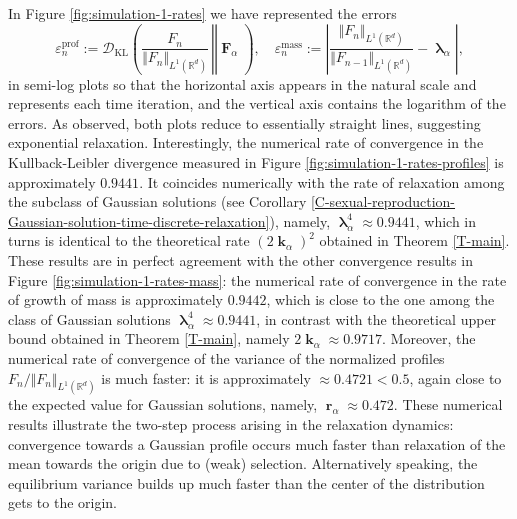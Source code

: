 \documentclass[reqno]{amsart}
\DeclareMathOperator{\blambda}{\boldsymbol{\lambda}}
\DeclareMathOperator{\bF}{\boldsymbol{F}}
\DeclareMathOperator{\bk}{\boldsymbol{k}}
\DeclareMathOperator{\br}{\boldsymbol{r}}
\numberwithin{equation}{section}
\begin{document}
{In Figure \ref{fig:simulation-1-rates} we have represented the errors
$$\varepsilon_n^{\text{prof}}:=\mathcal{D}_{\text{KL}}\left(\left.\frac{F_n}{\Vert F_n\Vert_{L^1(\mathbb{R}^d)}}\,\right\Vert \bF_\alpha\right),\quad \varepsilon_n^{\text{mass}}:=\left\vert\frac{\Vert F_n\Vert_{L^1(\mathbb{R}^d)}}{\Vert F_{n-1}\Vert_{L^1(\mathbb{R}^d)}}-\blambda_\alpha\right\vert,$$
in semi-log plots so that the horizontal axis appears in the natural scale and represents each time iteration, and the vertical axis contains the logarithm of the errors. As observed, both plots reduce to essentially straight lines, suggesting exponential relaxation. Interestingly, the numerical rate of convergence in the Kullback-Leibler divergence measured in Figure \ref{fig:simulation-1-rates-profiles} is approximately $0.9441$. It coincides numerically with the rate of relaxation among the subclass of Gaussian solutions (see Corollary \ref{C-sexual-reproduction-Gaussian-solution-time-discrete-relaxation}), namely, $\blambda_\alpha^4\approx 0.9441$, which in turns is identical to the theoretical rate $(2\bk_\alpha)^2$ obtained in Theorem \ref{T-main}.
These results are in perfect agreement with the other convergence results in Figure \ref{fig:simulation-1-rates-mass}: the numerical rate of convergence in the rate of growth of mass is approximately $0.9442$, which is close to the one among the class of Gaussian solutions $\blambda_\alpha^4\approx 0.9441$, in contrast with the theoretical upper bound obtained in Theorem \ref{T-main}, namely $2\bk_\alpha\approx 0.9717$. Moreover, the numerical rate of convergence of the variance of the normalized profiles $F_n/\Vert F_n\Vert_{L^1(\mathbb{R}^d)}$ is much faster: it is approximately $\approx 0.4721<0.5$, again close to the expected value for Gaussian solutions, namely,
$\br_\alpha\approx 0.472$. These numerical results illustrate the two-step process arising in the relaxation dynamics: convergence towards a Gaussian profile occurs much faster than relaxation of the mean towards the origin due to (weak) selection. Alternatively speaking, the equilibrium variance builds up much faster than the center of the distribution gets to the origin.

}
\end{document}

